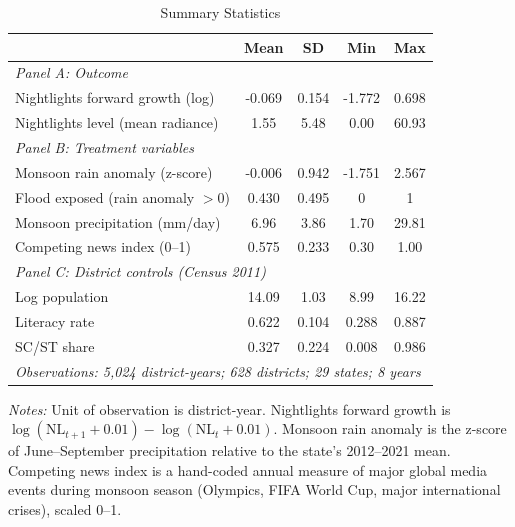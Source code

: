 \begin{table}[htbp]
\centering
\caption{Summary Statistics}
\label{tab:summ}
\begin{tabular}{lcccc}
\hline\hline
 & Mean & SD & Min & Max \\
\hline
\multicolumn{5}{l}{\textit{Panel A: Outcome}} \\
Nightlights forward growth (log) & -0.069 & 0.154 & -1.772 & 0.698 \\
Nightlights level (mean radiance) & 1.55 & 5.48 & 0.00 & 60.93 \\
\hline
\multicolumn{5}{l}{\textit{Panel B: Treatment variables}} \\
Monsoon rain anomaly (z-score) & -0.006 & 0.942 & -1.751 & 2.567 \\
Flood exposed (rain anomaly $> 0$) & 0.430 & 0.495 & 0 & 1 \\
Monsoon precipitation (mm/day) & 6.96 & 3.86 & 1.70 & 29.81 \\
Competing news index (0--1) & 0.575 & 0.233 & 0.30 & 1.00 \\
\hline
\multicolumn{5}{l}{\textit{Panel C: District controls (Census 2011)}} \\
Log population & 14.09 & 1.03 & 8.99 & 16.22 \\
Literacy rate & 0.622 & 0.104 & 0.288 & 0.887 \\
SC/ST share & 0.327 & 0.224 & 0.008 & 0.986 \\
\hline\hline
\multicolumn{5}{l}{\textit{Observations: 5,024 district-years; 628 districts; 29 states; 8 years}}
\end{tabular}
\begin{tablenotes}[flushleft]\small
\item \textit{Notes:} Unit of observation is district-year. Nightlights forward growth is $\log(\text{NL}_{t+1} + 0.01) - \log(\text{NL}_t + 0.01)$. Monsoon rain anomaly is the z-score of June--September precipitation relative to the state's 2012--2021 mean. Competing news index is a hand-coded annual measure of major global media events during monsoon season (Olympics, FIFA World Cup, major international crises), scaled 0--1.
\end{tablenotes}
\end{table}

